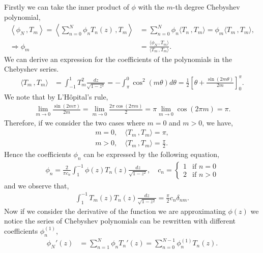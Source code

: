 \documentclass[a4paper, 12pt, twoside, openright]{article}
\numberwithin{equation}{section}
\begin{document}
Firstly we can take the inner product of $\phi$ with the $m$-th degree Chebyshev polynomial,
\begin{align}
\left\langle \phi_N \,, T_m \right\rangle = \left\langle \sum_{n=0}^{N} \phi_n T_n (z) \,, T_m \right\rangle &= \sum_{n=0}^{N} \phi_n \langle T_n  \,, T_m \rangle = \phi_m \langle T_m \,, T_m \rangle, \nonumber\\
\Rightarrow \phi_m &= \frac{\langle \phi_N \,, T_m \rangle}{\langle T_m \,, T_m \rangle}. 
\end{align}
We can derive an expression for the coefficients of the polynomials in the Chebyshev series.
\begin{align}
\langle T_m \,, T_m \rangle &= \int_{-1}^{1} T_{m}^2 \frac{dz}{\sqrt{1-z^2}} = - \int_{\pi}^{0} \cos^2(m\theta) d\theta = \frac{1}{2} \left[ \theta + \frac{\sin(2m\theta)}{2m} \right]^\pi _0. 
\end{align}
We note that by L'H\^opital's rule,
\begin{align}
\lim\limits_{m \to 0} \frac{\sin(2m\pi)}{2m} = \lim\limits_{m \to 0} \frac{2\pi\cos(2\pi m)}{2} = \pi \lim\limits_{m \to 0} \cos(2\pi m) = \pi.
\end{align}
Therefore, if we consider the two cases where $m=0$ and $m>0$, we have,
\begin{align}
m=0, \quad \langle T_m \,, T_m \rangle = \pi,\\
m>0, \quad \langle T_m \,, T_m \rangle = \frac{\pi}{2}.
\end{align}
Hence the coefficients $\phi_n$ can be expressed by the following equation,
\begin{align}
\phi_n = \frac{2}{\pi c_n}\int_{1}^{-1} \phi(z)T_n(z)\frac{dz}{\sqrt{1-z^2}}, \quad
c_n = \begin{cases}
1 &\text{if $n=0$}\\
2 &\text{if $n>0$}
\end{cases}
\end{align}
and we observe that, 
\begin{align}
\int_{1}^{-1} T_m(z)T_n(z)\frac{dz}{\sqrt{1-z^2}} = \frac{\pi}{2}c_n\delta_{nm}.
\end{align}
Now if we consider the derivative of the function we are approximating $\phi(z)$ we notice the series of Chebyshev polynomials can be rewritten with different coefficients $\phi_n^{(1)}$,
\begin{align}
\phi_{N}'(z) &= \sum_{n=1}^{N} \phi_n T_n '(z) = \sum_{n=0}^{N-1} \phi_{n}^{(1)} T_n (z).
\end{align}
\end{document}
